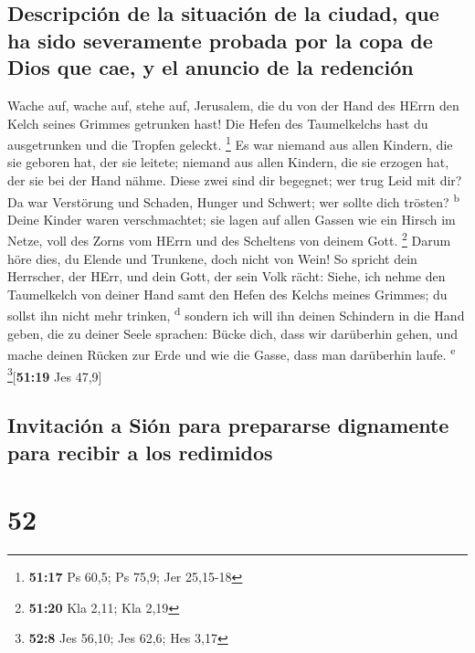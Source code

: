 \hypertarget{descripciuxf3n-de-la-situaciuxf3n-de-la-ciudad-que-ha-sido-severamente-probada-por-la-copa-de-dios-que-cae-y-el-anuncio-de-la-redenciuxf3n}{%
\subsection{Descripción de la situación de la ciudad, que ha sido
severamente probada por la copa de Dios que cae, y el anuncio de la
redención}\label{descripciuxf3n-de-la-situaciuxf3n-de-la-ciudad-que-ha-sido-severamente-probada-por-la-copa-de-dios-que-cae-y-el-anuncio-de-la-redenciuxf3n}}

 Wache auf, wache auf, stehe auf, Jerusalem, die du von
der Hand des HErrn den Kelch seines Grimmes getrunken hast! Die Hefen
des Taumelkelchs hast du ausgetrunken und die Tropfen geleckt.
\footnote{\textbf{51:17} Ps 60,5; Ps 75,9; Jer 25,15-18} 
Es war niemand aus allen Kindern, die sie geboren hat, der sie leitete;
niemand aus allen Kindern, die sie erzogen hat, der sie bei der Hand
nähme.  Diese zwei sind dir begegnet; wer trug Leid mit
dir? Da war Verstörung und Schaden, Hunger und Schwert; wer sollte dich
trösten? \textsuperscript{b}  Deine Kinder waren
verschmachtet; sie lagen auf allen Gassen wie ein Hirsch im Netze, voll
des Zorns vom HErrn und des Scheltens von deinem Gott. \footnote{\textbf{51:20}
  Kla 2,11; Kla 2,19}  Darum höre dies, du Elende und
Trunkene, doch nicht von Wein!  So spricht dein
Herrscher, der HErr, und dein Gott, der sein Volk rächt: Siehe, ich
nehme den Taumelkelch von deiner Hand samt den Hefen des Kelchs meines
Grimmes; du sollst ihn nicht mehr trinken, \textsuperscript{d}
 sondern ich will ihn deinen Schindern in die Hand geben,
die zu deiner Seele sprachen: Bücke dich, dass wir darüberhin gehen, und
mache deinen Rücken zur Erde und wie die Gasse, dass man darüberhin
laufe. \textsuperscript{e} \footnote{\textbf{52:8} Jes 56,10; Jes 62,6;
  Hes 3,17}{[}\textbf{51:19} Jes 47,9{]}

\hypertarget{invitaciuxf3n-a-siuxf3n-para-prepararse-dignamente-para-recibir-a-los-redimidos}{%
\subsection{Invitación a Sión para prepararse dignamente para recibir a
los
redimidos}\label{invitaciuxf3n-a-siuxf3n-para-prepararse-dignamente-para-recibir-a-los-redimidos}}

\hypertarget{section-51}{%
\section{52}\label{section-51}}

